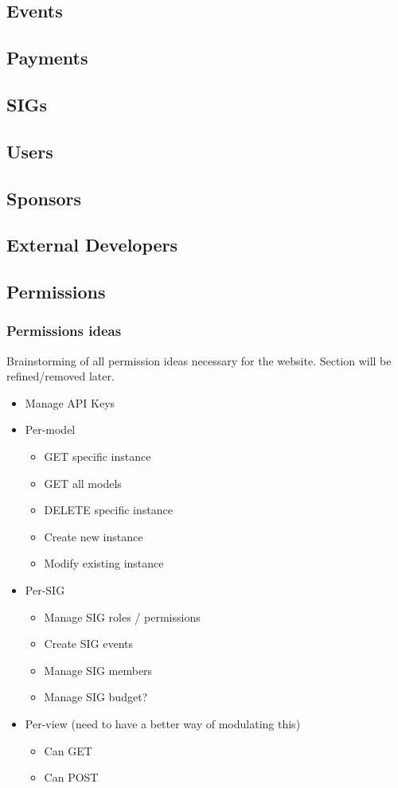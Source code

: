 \documentclass{article}
\begin{document}
\subsection{Events}
\subsection{Payments}
\subsection{SIGs}
\subsection{Users}
\subsection{Sponsors}
\subsection{External Developers}
\subsection{Permissions}
\subsubsection{Permissions ideas}
Brainstorming of all permission ideas necessary for the website. Section will be
refined/removed later.
\begin{itemize}
    \item Manage API Keys
    \item Per-model
    \begin{itemize}
        \item GET specific instance
        \item GET all models
        \item DELETE specific instance
        \item Create new instance
        \item Modify existing instance
    \end{itemize}

    \item Per-SIG
    \begin{itemize}
        \item Manage SIG roles / permissions
        \item Create SIG events
        \item Manage SIG members
        \item Manage SIG budget?
    \end{itemize}

    \item Per-view (need to have a better way of modulating this)
    \begin{itemize}
        \item Can GET
        \item Can POST
    \end{itemize}


\end{itemize}
\end{document}
